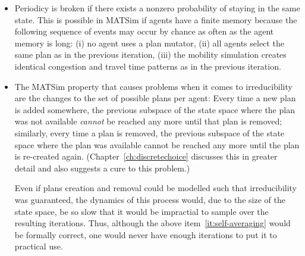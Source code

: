 \begin{itemize}

\item 

Periodicy is broken if there exists a nonzero probability of staying in
the same state. This is possible in MATSim if agents have a finite memory
because the following sequence of events may occur by chance as often as the 
agent memory is long: 
(i) no agent uses a plan mutator, 
(ii) all agents select the same plan as in the previous iteration, 
(iii) the mobility simulation creates identical congestion and travel time patterns as in the previous iteration.


\item 


The MATSim property that causes problems when it comes to irreducibility 
are the changes to the set of possible plans per agent: 
Every time a new plan is added somewhere, the previous subspace of the state space where the plan 
was not available \emph{cannot} be reached any more until that plan is removed; similarly, every time 
a plan is removed, the previous subspace of the state space where the plan was available cannot be 
reached any more until the plan is re-created again. (Chapter~\ref{ch:discretechoice}
discusses this in greater detail and also suggests a cure to this problem.)

Even if plans creation and removal could be modelled such that irreducibility was guaranteed, 
the dynamics of this process would, due to the size of the state space, be so slow that it would be 
impractial to sample over the resulting iterations. Thus, although the above item~\ref{it:self-averaging} 
would be formally correct, one would never have enough iterations to put it to practical use.

\end{itemize}

